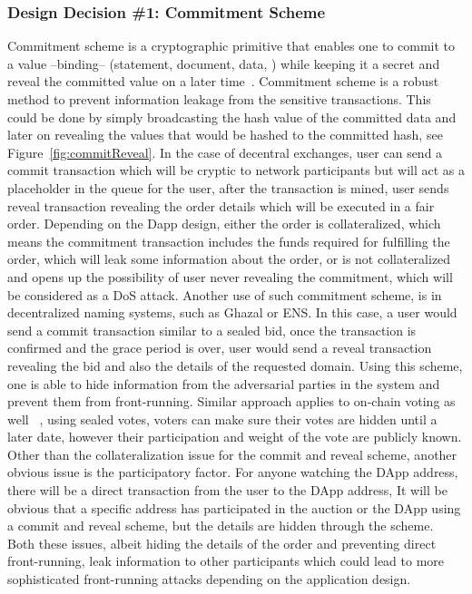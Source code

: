 


\subsubsection{Design Decision \#1: Commitment Scheme\newline} %
Commitment scheme is a cryptographic primitive that enables one to commit to a value --binding-- (\eg statement, document, data, \etc) while keeping it a secret and reveal the committed value on a later time~\cite{brassard1988minimum}. Commitment scheme is a robust method to prevent information leakage from the sensitive transactions. This could be done by simply broadcasting the hash value of the committed data and later on revealing the values that would be hashed to the committed hash, see Figure~\ref{fig:commitReveal}. 
In the case of decentral exchanges, user can send a commit transaction which will be cryptic to network participants but will act as a placeholder in the queue for the user, after the transaction is mined, user sends reveal transaction revealing the order details which will be executed in a fair order. Depending on the Dapp design, either the order is collateralized, which means the commitment transaction includes the funds required for fulfilling the order, which will leak some information about the order, or is not collateralized and opens up the possibility of user never revealing the commitment, which will be considered as a DoS attack. 
Another use of such commitment scheme, is in decentralized naming systems, such as Ghazal or ENS. In this case, a user would send a commit transaction similar to a sealed bid, once the transaction is confirmed and the grace period is over, user would send a reveal transaction revealing the bid and also the details of the requested domain. Using this scheme, one is able to hide information from the adversarial parties in the system and prevent them from front-running. Similar approach applies to on-chain voting as well ~\cite{adChainPLCRVoting}, using sealed votes, voters can make sure their votes are hidden until a later date, however their participation and weight of the vote are publicly known. 
Other than the collateralization issue for the commit and reveal scheme, another obvious issue is the participatory factor. For anyone watching the DApp address, there will be a direct transaction from the user to the DApp address, It will be obvious that a specific address has participated in the auction or the DApp using a commit and reveal scheme, but the details are hidden through the scheme. Both these issues, albeit hiding the details of the order and preventing direct front-running, leak information to other participants which could lead to more sophisticated front-running attacks depending on the application design.


